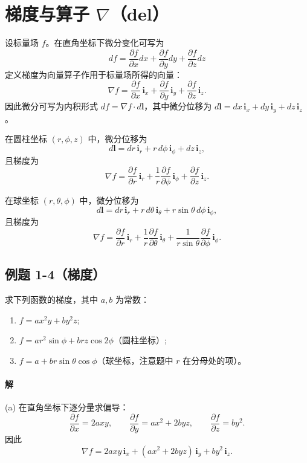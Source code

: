 \section{梯度与算子 $\nabla$（del）}

设标量场 $f$。在直角坐标下微分变化可写为
\[
df=\frac{\partial f}{\partial x}dx+\frac{\partial f}{\partial y}dy+\frac{\partial f}{\partial z}dz
\]
定义梯度为向量算子作用于标量场所得的向量：
\[
\nabla f=\frac{\partial f}{\partial x}\,\mathbf{i}_x+\frac{\partial f}{\partial y}\,\mathbf{i}_y+\frac{\partial f}{\partial z}\,\mathbf{i}_z.
\]
因此微分可写为内积形式 $df=\nabla f\cdot d\mathbf{l}$，其中微分位移为 $d\mathbf{l}=dx\,\mathbf{i}_x+dy\,\mathbf{i}_y+dz\,\mathbf{i}_z$。

在圆柱坐标 $(r,\phi,z)$ 中，微分位移为
\[
d\mathbf{l}=dr\,\mathbf{i}_r+r\,d\phi\,\mathbf{i}_\phi+dz\,\mathbf{i}_z,
\]
且梯度为
\[
\nabla f=\frac{\partial f}{\partial r}\,\mathbf{i}_r+\frac{1}{r}\frac{\partial f}{\partial\phi}\,\mathbf{i}_\phi+\frac{\partial f}{\partial z}\,\mathbf{i}_z.
\]

在球坐标 $(r,\theta,\phi)$ 中，微分位移为
\[
d\mathbf{l}=dr\,\mathbf{i}_r+r\,d\theta\,\mathbf{i}_\theta+r\sin\theta\,d\phi\,\mathbf{i}_\phi,
\]
且梯度为
\[
\nabla f=\frac{\partial f}{\partial r}\,\mathbf{i}_r+\frac{1}{r}\frac{\partial f}{\partial\theta}\,\mathbf{i}_\theta+\frac{1}{r\sin\theta}\frac{\partial f}{\partial\phi}\,\mathbf{i}_\phi.
\]

\subsection{例题 1-4（梯度）}
求下列函数的梯度，其中 $a,b$ 为常数：
\begin{enumerate}
\item[(a)] $f=ax^2y+by^2z$;
\item[(b)] $f=ar^2\sin\phi+brz\cos2\phi$（圆柱坐标）;
\item[(c)] $f=a+br\sin\theta\cos\phi$（球坐标，注意题中 $r$ 在分母处的项）。
\end{enumerate}

\paragraph{解}
(a) 在直角坐标下逐分量求偏导：
\[
\frac{\partial f}{\partial x}=2ax y,\qquad \frac{\partial f}{\partial y}=ax^2+2by z,\qquad \frac{\partial f}{\partial z}=by^2.
\]
因此
\[
\nabla f=2ax y\,\mathbf{i}_x+(ax^2+2by z)\,\mathbf{i}_y+by^2\,\mathbf{i}_z.
\]

